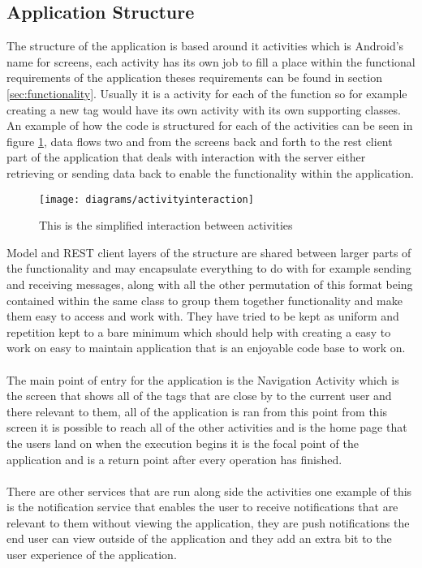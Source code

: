 \subsection{Application Structure}
\label{sec:android_application_structure}

The structure of the application is based around it activities which is Android's name for screens, each activity has its own job to fill a place within the functional requirements of the application theses requirements can be found in section \ref{sec:functionality}. Usually it is a activity for each of the function so for example creating a new tag would have its own activity with its own supporting classes. An example of how the code is structured for each of the activities can be seen in figure \ref{fig:activity_interation_image}, data flows two and from the screens back and forth to the rest client part of the application that deals with interaction with the server either retrieving or sending data back to enable the functionality within the application.\\

\begin{figure}[H]
    \centering
    \texttt{[image: diagrams/activityinteraction]}
    \caption{This is the simplified interaction between activities}
    \label{fig:activity_interation_image}
\end{figure} 

\noindent
Model and REST client layers of the structure are shared between larger parts of the functionality and may encapsulate everything to do with for example sending and receiving messages, along with all the other permutation of this format being contained within the same class to group them together functionality and make them easy to access and work with. They have tried to be kept as uniform and repetition kept to a bare minimum which should help with creating a easy to work on easy to maintain application that is an enjoyable code base to work on.\\
\\
The main point of entry for the application is the Navigation Activity which is the screen that shows all of the tags that are close by to the current user and there relevant to them, all of the application is ran from this point from this screen it is possible to reach all of the other activities and is the home page that the users land on when the execution begins it is the focal point of the application and is a return point after every operation has finished.\\
\\
There are other services that are run along side the activities one example of this is the notification service that enables the user to receive notifications that are relevant to them without viewing the application, they are push notifications the end user can view outside of the application and they add an extra bit to the user experience of the application.

